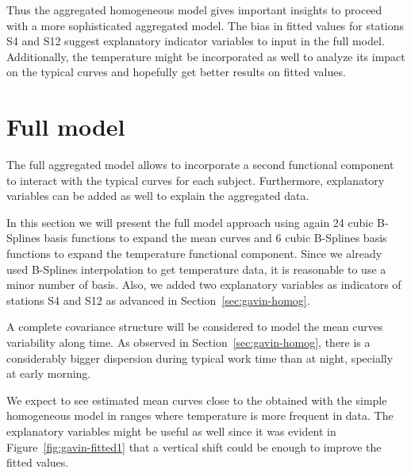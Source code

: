 Thus the aggregated homogeneous model gives important insights to proceed with a more sophisticated aggregated model. The bias in fitted values for stations S4 and S12 suggest explanatory indicator variables to input in the full model. Additionally, the temperature might be incorporated as well to analyze its impact on the typical curves and hopefully get better results on  fitted values. 









\section{Full model}
\label{sec:gavin-fm}



The full aggregated model allows to incorporate a second functional component to  interact with the typical curves for each subject. Furthermore, explanatory variables can be added as well to explain the aggregated data.

In this section we will present the full model approach using again 24 cubic B-Splines basis functions to expand the mean curves and 6 cubic B-Splines basis functions to expand the temperature functional component. Since we already used B-Splines interpolation to get temperature data, it is reasonable to use a minor number of basis. Also, we added two explanatory variables as indicators of stations S4 and S12 as advanced in Section~\ref{sec:gavin-homog}.

A complete covariance structure will be considered to model the mean curves variability along time. As observed in Section~\ref{sec:gavin-homog}, there is a considerably bigger dispersion during typical work time than at night, specially at early morning.

We expect to see estimated mean curves close to the obtained with the simple homogeneous model in ranges where temperature is more frequent in data. The explanatory variables might be useful as well since it was evident in Figure~\ref{fig:gavin-fitted1} that a vertical shift could be enough to improve the fitted values.


